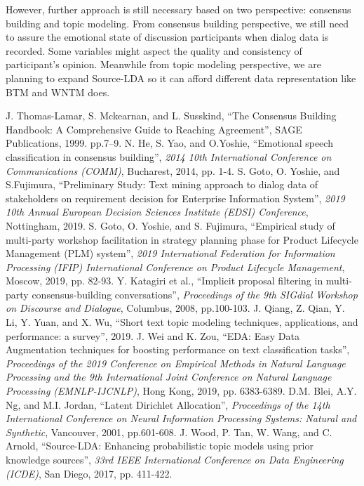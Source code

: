 \documentclass[conference]{IEEEtran}
\begin{document}
However, further approach is still necessary based on two perspective: consensus building and topic modeling. From consensus building perspective, we still need to assure the emotional state of discussion participants when dialog data is recorded. Some variables might aspect the quality and consistency of participant's opinion. Meanwhile from topic modeling perspective, we are planning to expand Source-LDA so it can afford different data representation like BTM and WNTM does.

\begin{thebibliography}{00}
 J. Thomas-Lamar, S. Mckearnan, and L. Susskind, ``The Consensus Building Handbook: A Comprehensive Guide to Reaching Agreement'', SAGE Publications, 1999. pp.7--9.
 N. He, S. Yao, and O.Yoshie, ``Emotional speech classification in consensus building'', {\it 2014 10th International Conference on Communications (COMM)}, Bucharest, 2014, pp. 1-4.
 S. Goto, O. Yoshie, and S.Fujimura, ``Preliminary Study: Text mining approach to dialog data of stakeholders on requirement decision for Enterprise Information System'', {\it 2019 10th Annual European Decision Sciences Institute (EDSI) Conference}, Nottingham, 2019.
 S. Goto, O. Yoshie, and S. Fujimura, ``Empirical study of multi-party workshop facilitation in strategy planning phase for Product Lifecycle Management (PLM) system'', {\it 2019 International Federation for Information Processing (IFIP) International Conference on Product Lifecycle Management}, Moscow, 2019, pp. 82-93.
 Y. Katagiri et al., ``Implicit proposal filtering in multi-party consensus-building conversations'', {\it Proceedings of the 9th SIGdial Workshop on Discourse and Dialogue}, Columbus, 2008, pp.100-103.
 J. Qiang, Z. Qian, Y. Li, Y. Yuan, and X. Wu, ``Short text topic modeling techniques, applications, and performance: a survey'', 2019.
 J. Wei and K. Zou, ``EDA: Easy Data Augmentation techniques for boosting performance on text classification tasks'', {\it Proceedings of the 2019 Conference on Empirical Methods in Natural Language Processing and the 9th International Joint Conference on Natural Language Processing (EMNLP-IJCNLP)}, Hong Kong, 2019, pp. 6383-6389.
 D.M. Blei, A.Y. Ng, and M.I. Jordan, ``Latent Dirichlet Allocation'', {\it Proceedings of the 14th International Conference on Neural Information Processing Systems: Natural and Synthetic}, Vancouver, 2001, pp.601-608.
 J. Wood, P. Tan, W. Wang, and C. Arnold, ``Source-LDA: Enhancing probabilistic topic models using prior knowledge sources'', {\it 33rd IEEE International Conference on Data Engineering (ICDE)}, San Diego, 2017, pp. 411-422. 

\end{thebibliography}
\end{document}
